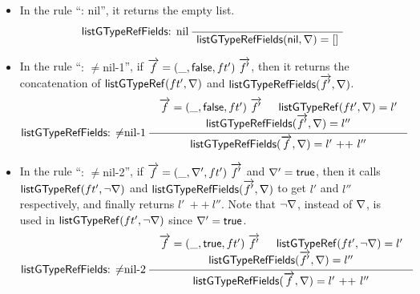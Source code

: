 \begin{itemize}
	\begin{gather*}
		\infer[\listgtyperef: bundle]
		{
		 \listgtyperef(\btype, \myvec{f}, \flipped) =  \listgtypereffields(\myvec{f}, \flipped)
		}
		{
		}
	\end{gather*}
%	
	\item In the rule ``\listgtypereffields: nil'', it returns the empty list. 
	
	\begin{gather*}
		\infernone[\listgtypereffields: nil]
	{\seqq{\listgtypereffields(\nil, \flipped) = []}}
	\end{gather*}	
%
	\item In the rule ``{\listgtypereffields: $\neq$nil-1}'', if $\overrightarrow{f} = (\_, {\sf false}, ft')\  \overrightarrow{f'}$, then it returns the concatenation of ${\sf listGTypeRef}(ft', \nabla)$ and ${\sf listGTypeRefFields}(\overrightarrow{f'}, \nabla)$. 
	\begin{gather*}
	\infer[\listgtypereffields: $\neq$nil-1]
	{\seqq{\listgtypereffields(\myvec{f}, \flipped) = l'\ {++}\ l''}}
	{
		\begin{array}{c}
			\myvec{f} = (\_, \lfalse, ft')\  \myvec{f'} \hspace{15pt} \listgtyperef(ft', \flipped) = l' \\
			 \listgtypereffields(\myvec{f'}, \flipped) = l''
		\end{array}
	}
	\end{gather*}	
%
	\item In the rule ``{\listgtypereffields: $\neq$nil-2}'', if   $\myvec{f} = (\_, \flipped', ft')\ \myvec{f'}$ and $\nabla' = {\sf true}$, then it calls ${\sf listGTypeRef}(ft', \neg \nabla)$ and ${\sf listGTypeRefFields}(\overrightarrow{f'}, \nabla)$ to get $l'$ and $l''$ respectively, and finally returns $l' \ ++\ l''$. Note that $\neg \nabla$, instead of $\nabla$, is used in ${\sf listGTypeRef}(ft', \neg \nabla)$ since $\nabla' = {\sf true}$. 
	\begin{gather*}
	\infer[\listgtypereffields: $\neq$nil-2]
	{\seqq{\listgtypereffields(\myvec{f}, \flipped) = l'\ {++}\ l''}}
	{
		\begin{array}{c}
			\myvec{f} = (\_, \ltrue, ft')\  \myvec{f'} \hspace{15pt} \listgtyperef(ft', \neg \flipped) = l' \\
			 \listgtypereffields(\myvec{f'}, \flipped) = l''
		\end{array}
	}
	\end{gather*}
\end{itemize}


